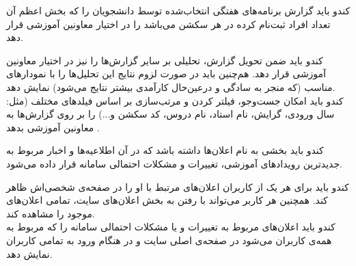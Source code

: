 \documentclass{report}
\begin{document}
                                                                                                                                                                                                                         کندو باید گزارش برنامه‌های هفتگی انتخاب‌شده توسط دانشجویان را که بخش اعظم آن تعداد افراد ثبت‌نام کرده در هر سکشن می‌باشد را در اختیار معاونین آموزشی قرار دهد.                                                                                                                                                                                                                         \begin{adjustwidth}{2em}{0pt}                                                                                                                                                                                                                                                                                                                                                                                                                                                  کندو باید ضمن تحویل گزارش، تحلیلی بر سایر گزارش‌ها را نیز در اختیار معاونین آموزشی قرار دهد. هم‌چنین باید در صورت لزوم نتایج این تحلیل‌ها را با نمودارهای مناسب (که منجر به سادگی و درعین‌حال کارآمدی بیشتر نتایج می‌شود)  نمایش دهد.
\\
          کندو باید امکان جست‌وجو، فیلتر کردن و مرتب‌سازی بر اساس فیلدهای مختلف (مثل: سال ورودی، گرایش، نام استاد، نام دروس، کد سکشن و...) را بر روی گزارش‌ها به معاونین آموزشی بدهد                                                                                                                                                                                                                .
\end{adjustwidth}
                                                                                                                                                                                                                          کندو باید بخشی به نام اعلان‌ها داشته باشد که در آن  اطلاعیه‌ها و اخبار مربوط به جدیدترین رویدادهای آموزشی، تغییرات و مشکلات احتمالی سامانه قرار داده می‌شود.                                                                                                                                                                                                                        
\begin{adjustwidth}{2em}{0pt}
                                                                                                                                                                                                                          کندو باید برای هر یک از کاربران اعلان‌های مرتبط با او را در صفحه‌ی شخصی‌اش ظاهر کند. همچنین هر کاربر می‌تواند با رفتن به بخش اعلان‌های سایت، تمامی اعلان‌های موجود را مشاهده کند.
\\
         کندو باید اعلان‌های مربوط به تغییرات و یا مشکلات احتمالی سامانه را که مربوط به همه‌ی کاربران می‌شود در صفحه‌ی اصلی سایت و در هنگام ورود به تمامی 
        کاربران نمایش دهد.    
\end{adjustwidth}  
\end{document}

